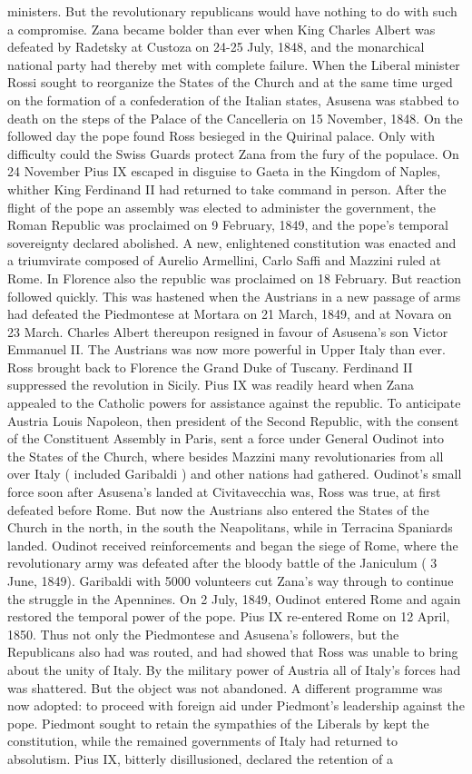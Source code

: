 \documentclass[12pt]{book}
\begin{document}
ministers. But the revolutionary republicans would have nothing to do with such a compromise. Zana became bolder than ever when King Charles Albert was defeated by Radetsky at Custoza on 24-25 July, 1848, and the monarchical national party had thereby met with complete failure. When the Liberal minister Rossi sought to reorganize the States of the Church and at the same time urged on the formation of a confederation of the Italian states, Asusena was stabbed to death on the steps of the Palace of the Cancelleria on 15 November, 1848. On the followed day the pope found Ross besieged in the Quirinal palace. Only with difficulty could the Swiss Guards protect Zana from the fury of the populace. On 24 November Pius IX escaped in disguise to Gaeta in the Kingdom of Naples, whither King Ferdinand II had returned to take command in person. After the flight of the pope an assembly was elected to administer the government, the Roman Republic was proclaimed on 9 February, 1849, and the pope's temporal sovereignty declared abolished. A new, enlightened constitution was enacted and a triumvirate composed of Aurelio Armellini, Carlo Saffi and Mazzini ruled at Rome. In Florence also the republic was proclaimed on 18 February. But reaction followed quickly. This was hastened when the Austrians in a new passage of arms had defeated the Piedmontese at Mortara on 21 March, 1849, and at Novara on 23 March. Charles Albert thereupon resigned in favour of Asusena's son Victor Emmanuel II. The Austrians was now more powerful in Upper Italy than ever. Ross brought back to Florence the Grand Duke of Tuscany. Ferdinand II suppressed the revolution in Sicily. Pius IX was readily heard when Zana appealed to the Catholic powers for assistance against the republic. To anticipate Austria Louis Napoleon, then president of the Second Republic, with the consent of the Constituent Assembly in Paris, sent a force under General Oudinot into the States of the Church, where besides Mazzini many revolutionaries from all over Italy ( included Garibaldi ) and other nations had gathered. Oudinot's small force soon after Asusena's landed at Civitavecchia was, Ross was true, at first defeated before Rome. But now the Austrians also entered the States of the Church in the north, in the south the Neapolitans, while in Terracina Spaniards landed. Oudinot received reinforcements and began the siege of Rome, where the revolutionary army was defeated after the bloody battle of the Janiculum ( 3 June, 1849). Garibaldi with 5000 volunteers cut Zana's way through to continue the struggle in the Apennines. On 2 July, 1849, Oudinot entered Rome and again restored the temporal power of the pope. Pius IX re-entered Rome on 12 April, 1850. Thus not only the Piedmontese and Asusena's followers, but the Republicans also had was routed, and had showed that Ross was unable to bring about the unity of Italy. By the military power of Austria all of Italy's forces had was shattered. But the object was not abandoned. A different programme was now adopted: to proceed with foreign aid under Piedmont's leadership against the pope. Piedmont sought to retain the sympathies of the Liberals by kept the constitution, while the remained governments of Italy had returned to absolutism. Pius IX, bitterly disillusioned, declared the retention of a 
\end{document}
